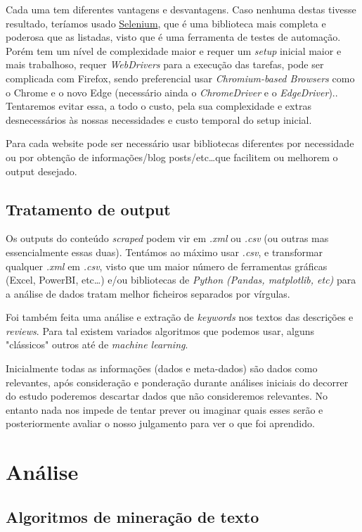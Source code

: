 Cada uma tem diferentes vantagens e desvantagens.
Caso nenhuma destas tivesse resultado, teríamos usado \href{https://pypi.org/project/selenium/}{Selenium}, que é uma biblioteca mais completa e poderosa que as listadas, visto que é uma ferramenta de testes de automação.
Porém tem um nível de complexidade maior e requer um \textit{setup} inicial maior e mais trabalhoso, requer \textit{WebDrivers} para a execução das tarefas, pode ser complicada com Firefox, sendo preferencial usar \textit{Chromium-based Browsers} como o Chrome e o novo Edge (necessário ainda o \textit{ChromeDriver} e o \textit{EdgeDriver})..
Tentaremos evitar essa, a todo o custo, pela sua complexidade e extras desnecessários às nossas necessidades e custo temporal do setup inicial.

Para cada website pode ser necessário usar bibliotecas diferentes por necessidade ou por obtenção de informações/blog posts/etc\ldots que facilitem ou melhorem o output desejado.

\subsection{Tratamento de output}

Os outputs do conteúdo \textit{scraped} podem vir em \textit{.xml} ou \textit{.csv} (ou outras mas essencialmente essas duas).
Tentámos ao máximo usar \textit{.csv}, e transformar qualquer \textit{.xml} em \textit{.csv}, visto que um maior número de ferramentas gráficas (Excel, PowerBI, etc\ldots) e/ou bibliotecas de \textit{Python (Pandas, matplotlib, etc)} para a análise de dados tratam melhor ficheiros separados por vírgulas.

Foi também feita uma análise e extração de \textit{keywords} nos textos das descrições e \textit{reviews}.
Para tal existem variados algoritmos que podemos usar, alguns "clássicos" outros até de \textit{machine learning}.

Inicialmente todas as informações (dados e meta-dados) são dados como relevantes, após consideração e ponderação durante análises iniciais do decorrer do estudo poderemos descartar dados que não consideremos relevantes.
No entanto nada nos impede de tentar prever ou imaginar quais esses serão e posteriormente avaliar o nosso julgamento para ver o que foi aprendido.

\section{Análise}
\subsection{Algoritmos de mineração de texto}

